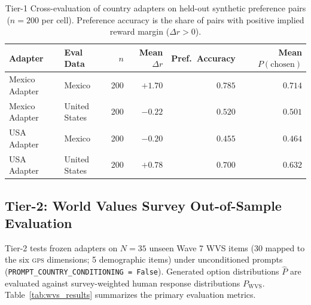 \documentclass[11pt,letterpaper]{article}
\newcommand{\GPS}{\textsc{gps}}
\begin{document}
\begin{table}[h!]
\centering
\caption{Tier-1 Cross-evaluation of country adapters on held-out synthetic preference pairs ($n=200$ per cell). Preference accuracy is the share of pairs with positive implied reward margin ($\Delta r > 0$).}
\label{tab:main}
\scriptsize
\begin{tabular}{@{}ll rrrr@{}}
\toprule
\textbf{Adapter} & \textbf{Eval Data} & \textbf{$n$} & \textbf{Mean $\Delta r$} & \textbf{Pref.\ Accuracy} & \textbf{Mean $P(\mathrm{chosen})$} \\
\midrule
Mexico Adapter & Mexico & 200 & $+1.70$ & $0.785$ & $0.714$ \\
Mexico Adapter & United States & 200 & $-0.22$ & $0.520$ & $0.501$ \\
USA Adapter & Mexico & 200 & $-0.20$ & $0.455$ & $0.464$ \\
USA Adapter & United States & 200 & $+0.78$ & $0.700$ & $0.632$ \\
\bottomrule
\end{tabular}
\end{table}

\subsection{Tier-2: World Values Survey Out-of-Sample Evaluation}

Tier-2 tests frozen adapters on $N=35$ unseen Wave 7 WVS items (30 mapped to the six \GPS{} dimensions; 5 demographic items) under unconditioned prompts (\texttt{PROMPT\_COUNTRY\_CONDITIONING = False}). Generated option distributions $\hat{P}$ are evaluated against survey-weighted human response distributions $P_{\mathrm{WVS}}$. Table~\ref{tab:wvs_results} summarizes the primary evaluation metrics.
\end{document}
